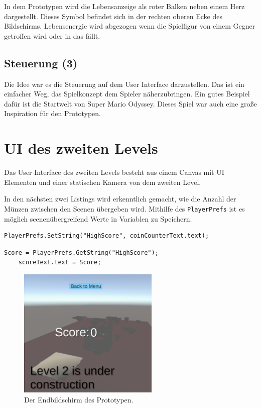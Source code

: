 In dem Prototypen wird die Lebensanzeige als roter Balken neben einem Herz dargestellt. Dieses Symbol befindet sich in der rechten oberen Ecke des Bildschirms. Lebensenergie wird abgezogen wenn die Spielfigur von einem Gegner getroffen wird oder in das  fällt.

\subsection{Steuerung (3)}
Die Idee war es die Steuerung auf dem User Interface darzustellen. Das ist ein einfacher Weg, das Spielkonzept dem Spieler näherzubringen. Ein gutes Beispiel dafür ist die Startwelt von Super Mario Odyssey. Dieses Spiel war auch eine große Inspiration für den Prototypen. 

\section{UI des zweiten Levels}
Das User Interface des zweiten Levels besteht aus einem Canvas mit UI Elementen und einer statischen Kamera von dem zweiten Level. 

In den nächsten zwei Listings wird erkenntlich gemacht, wie die Anzahl der Münzen zwischen den Scenen übergeben wird. Mithilfe des \verb+PlayerPrefs+ ist es möglich scenenübergreifend Werte in Variablen zu Speichern. 
\begin{lstlisting}[language=CSharp,caption={Portal Klasse.},label=code:portal]
    PlayerPrefs.SetString("HighScore", coinCounterText.text);
\end{lstlisting}

\begin{lstlisting}[language=CSharp,caption={GameManager Klasse.},label=code:gamemanager]
    Score = PlayerPrefs.GetString("HighScore");
    scoreText.text = Score;
\end{lstlisting}


\begin{figure}[h]
    \centering
    \includegraphics[width=0.6\textwidth]{chapters/04/images/V3/Level2Game.png}
    \caption{Der Endbildschirm des Prototypen.}
    \label{fig:UI20}
\end{figure}